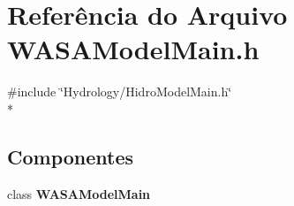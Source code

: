 \section{Referência do Arquivo W\+A\+S\+A\+Model\+Main.\+h}
\label{_w_a_s_a_model_main_8h}
{\ttfamily \#include \char`\"{}Hydrology/\+Hidro\+Model\+Main.\+h\char`\"{}}\\*
\subsection*{Componentes}
\begin{DoxyCompactItemize}
\item 
class {\bf W\+A\+S\+A\+Model\+Main}
\end{DoxyCompactItemize}

